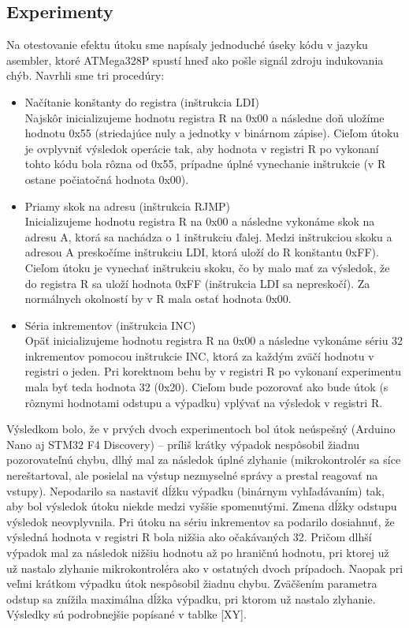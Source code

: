\subsection{Experimenty}
Na otestovanie efektu útoku sme napísaly jednoduché úseky kódu v jazyku asembler, ktoré ATMega328P spustí hneď ako pošle signál zdroju indukovania chýb. Navrhli sme tri procedúry:
\begin{itemize}
    \item Načítanie konštanty do registra (inštrukcia LDI)\\
    Najskôr inicializujeme hodnotu registra R na 0x00 a následne doň uložíme hodnotu 0x55 (striedajúce nuly a jednotky v binárnom zápise). Cieľom útoku je ovplyvniť výsledok operácie tak, aby hodnota v registri R po vykonaní tohto kódu bola rôzna od 0x55, prípadne úplné vynechanie inštrukcie (v R ostane počiatočná hodnota 0x00).
    \item Priamy skok na adresu (inštrukcia RJMP)\\
    Inicializujeme hodnotu registra R na 0x00 a následne vykonáme skok na adresu A, ktorá sa nachádza o 1 inštrukciu ďalej. Medzi inštrukciou skoku a adresou A preskočíme inštrukciu LDI, ktorá uloží do R konštantu 0xFF). Cieľom útoku je vynechať inštrukciu skoku, čo by malo mať za výsledok, že do registra R sa uloží hodnota 0xFF (inštrukcia LDI sa nepreskočí). Za normálnych okolností by v R mala ostať hodnota 0x00.
    \item Séria inkrementov (inštrukcia INC)\\
    Opäť inicializujeme hodnotu registra R na 0x00 a následne vykonáme sériu 32 inkrementov pomocou inštrukcie INC, ktorá za každým zväčí hodnotu v registri o jeden. Pri korektnom behu by v registri R po vykonaní experimentu mala byť teda hodnota 32 (0x20). Cieľom bude pozorovať ako bude útok (s rôznymi hodnotami odstupu a výpadku) vplývať na výsledok v registri R.
\end{itemize}

Výsledkom bolo, že v prvých dvoch experimentoch bol útok neúspešný (Arduino Nano aj STM32 F4 Discovery) -- príliš krátky výpadok nespôsobil žiadnu pozorovateľnú chybu, dlhý mal za následok úplné zlyhanie (mikrokontrolér sa síce nereštartoval, ale posielal na výstup nezmyselné správy a prestal reagovať na vstupy). Nepodarilo sa nastaviť dĺžku výpadku (binárnym vyhľadávaním) tak, aby bol výsledok útoku niekde medzi vyššie spomenutými. Zmena dĺžky odstupu výsledok neovplyvnila. Pri útoku na sériu inkrementov sa podarilo dosiahnuť, že výsledná hodnota v registri R bola nižšia ako očakávaných 32. Pričom dlhší výpadok mal za následok nižšiu hodnotu až po hraničnú hodnotu, pri ktorej už už nastalo zlyhanie mikrokontroléra ako v ostatných dvoch prípadoch. Naopak pri veľmi krátkom výpadku útok nespôsobil žiadnu chybu. Zväčšením parametra odstup sa znížila maximálna dĺžka výpadku, pri ktorom už nastalo zlyhanie. Výsledky sú podrobnejšie popísané v tablke [XY].

